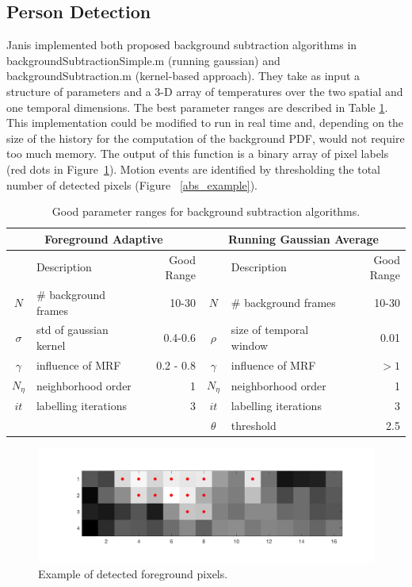 \documentclass[12pt,oneside]{article} %
\begin{document}
\subsection{Person Detection}
Janis implemented both proposed background subtraction algorithms in backgroundSubtractionSimple.m 
(running gaussian) and backgroundSubtraction.m (kernel-based approach).
They take as input a structure of parameters
and a 3-D array of temperatures over the two spatial and one temporal dimensions. 
The best parameter ranges are described in Table \ref{bs_paramstable}.
This implementation could
be modified to run in real time and, depending on the size of the history for the computation of the background
PDF, would not require too much memory. The output of this function is a binary array of pixel labels 
(red dots in Figure~\ref{foregroundexample}). Motion events are identified by
thresholding the total number of detected pixels (Figure~ \ref{abs_example}).
\begin{table}[htb]\begin{tabular}{|clr|clr|}
\hline
\multicolumn{3}{|c|}{Foreground Adaptive} & \multicolumn{3}{|c|}{Running Gaussian Average}\\
\hline
& Description & Good Range & & Description & Good Range\\
\hline
$N$ & \# background frames & 10-30 & $N$ & \# background frames & 10-30\\
$\sigma$ & std of gaussian kernel & 0.4-0.6 & $\rho$ & size of temporal window & 0.01\\
$\gamma$ & influence of MRF & 0.2 - 0.8 & $\gamma$ & influence of MRF & $>1$\\
$N_\eta$ & neighborhood order & 1 & $N_\eta$ & neighborhood order & 1\\
$it$ & labelling iterations & 3 & $it$ & labelling iterations & 3\\
 &  &  & $\theta$ & threshold & 2.5\\
\hline
\end{tabular}
\caption{Good parameter ranges for background subtraction algorithms.}
\label{bs_paramstable}
\end{table}

\begin{figure}[htb] 
\centering
\includegraphics[scale=0.45]{images/foreground_example.png}
\caption{Example of detected foreground pixels.}
\label{foregroundexample}
\end{figure}
\end{document}
